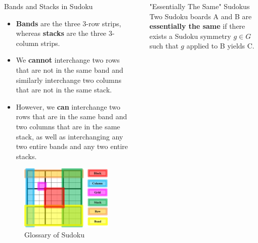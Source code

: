 \documentclass[final]{beamer}
\newlength{\sepwidth}
\newlength{\colwidth}
\newcommand{\separatorcolumn}{\begin{column}{\sepwidth}\end{column}}
\begin{document}
\begin{frame}[t]
\begin{columns}[t]
\begin{column}{\colwidth}
\begin{block}{\Large Bands and Stacks in Sudoku}
\large
\begin{itemize}
    \item \textbf{Bands} are the three $3$-row strips, whereas \textbf{stacks} are the three $3$-column strips.
    \item We \textbf{cannot} interchange two rows that are not in the same band and similarly interchange two columns that are not in the same stack.
    \item However, we \textbf{can} interchange two rows that are in the same band and two columns that are in the same stack, as well as interchanging any two entire bands and any two entire stacks.
\end{itemize} 
\begin{figure}
        \centering
        \includegraphics[scale=1.2]{pic/SudokuNotation.png}
        \caption{Glossary of Sudoku}
        \label{fig:my_label}
    \end{figure}
    
  \end{block}

  
  

\end{column}

\separatorcolumn

\begin{column}{\colwidth}

\begin{alertblock}{\Large "Essentially The Same" Sudokus}
   \large Two Sudoku boards A and B are \textbf{essentially the same} if there exists a Sudoku symmetry $g \in G$ such that $g$ applied to B yields C.
  \end{alertblock}




\end{column}
\end{columns}
\end{frame}
\end{document}
